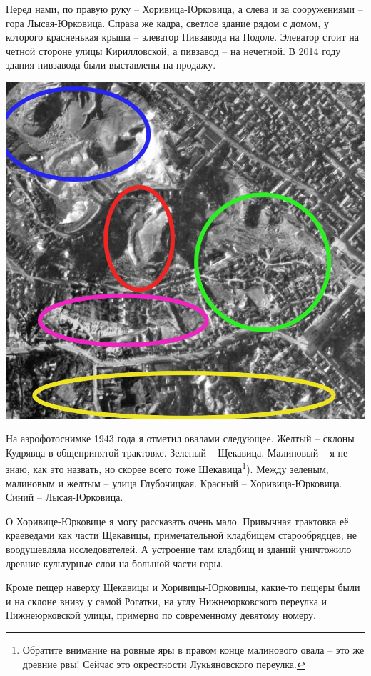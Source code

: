 Перед нами, по правую руку – Хоривица-Юрковица, а слева и за сооружениями – гора Лысая-Юрковица. Справа же кадра, светлое здание рядом с домом, у которого красненькая крыша – элеватор Пивзавода на Подоле. Элеватор стоит на четной стороне улицы Кирилловской, а пивзавод – на нечетной. В 2014 году здания пивзавода были выставлены на продажу.

\begin{center}
\includegraphics[width=\linewidth]{chast-kirvys/yourk/y.jpg}
\end{center} 

На аэрофотоснимке 1943 года я отметил овалами следующее. Желтый – склоны Кудрявца в общепринятой трактовке. Зеленый – Щекавица. Малиновый – я не знаю, как это назвать, но скорее всего тоже Щекавица\footnote{Обратите внимание на ровные яры в правом конце малинового овала – это же древние рвы! Сейчас это окрестности Лукьяновского переулка.}). Между зеленым, малиновым и желтым – улица Глубочицкая. Красный – Хоривица-Юрковица. Синий – Лысая-Юрковица.

О Хоривице-Юрковице я могу рассказать очень мало. Привычная трактовка её краеведами как части Щекавицы, примечательной кладбищем старообрядцев, не воодушевляла исследователей. А устроение там кладбищ и зданий уничтожило древние культурные слои на большой части горы.

Кроме пещер наверху Щекавицы и Хоривицы-Юрковицы, какие-то пещеры были и на склоне внизу у самой Рогатки, на углу Нижнеюрковского переулка и Нижнеюрковской улицы, примерно по современному девятому номеру.

